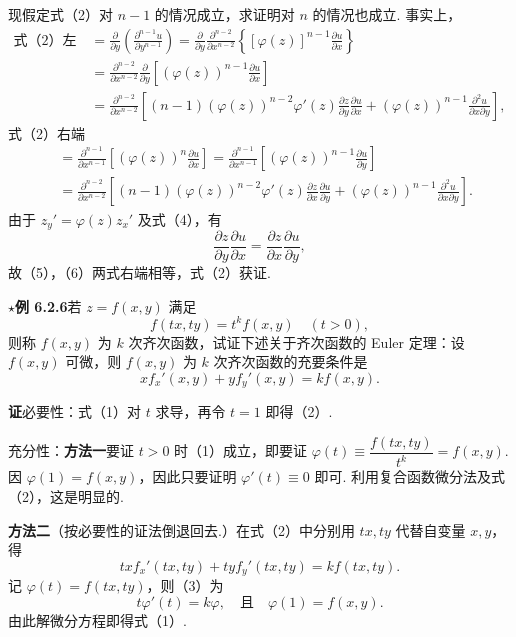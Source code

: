 \documentclass[UTF8,12pt,a4paper,fontset=fandol]{ctexart}
\begin{document}
现假定式（2）对 $n-1$ 的情况成立，求证明对 $n$ 的情况也成立. 事实上，
\[
\begin{aligned}
  \text{式（2）左端}
  &=\frac{\partial}{\partial y}\left(\frac{\partial^{n-1}u}{\partial y^{n-1}}\right)
  =\frac{\partial}{\partial y}\frac{\partial^{n-2}}{\partial x^{n-2}}
  \left\{[\varphi(z)]^{n-1}\frac{\partial u}{\partial x}\right\}\\
  &=\frac{\partial^{n-2}}{\partial x^{n-2}}\frac{\partial}{\partial y}
  \left[(\varphi(z))^{n-1}\frac{\partial u}{\partial x}\right]\\
  &=\frac{\partial^{n-2}}{\partial x^{n-2}}\left[
  (n-1)(\varphi(z))^{n-2}\varphi'(z)\frac{\partial z}{\partial y}\frac{\partial u}{\partial x}
  +(\varphi(z))^{n-1}\frac{\partial^2u}{\partial x\partial y}\right],
\end{aligned} \tag{5}
\]
式（2）右端
\[
\begin{aligned}
  &=\frac{\partial^{n-1}}{\partial x^{n-1}}\left[(\varphi(z))^n\frac{\partial u}{\partial x}\right]
  =\frac{\partial^{n-1}}{\partial x^{n-1}}\left[(\varphi(z))^{n-1}\frac{\partial u}{\partial y}\right]\\
  &=\frac{\partial^{n-2}}{\partial x^{n-2}}\left[
  (n-1)(\varphi(z))^{n-2}\varphi'(z)\frac{\partial z}{\partial x}\frac{\partial u}{\partial y}
  +(\varphi(z))^{n-1}\frac{\partial^2u}{\partial x\partial y}\right].
\end{aligned} \tag{6}
\]
由于 $z_y'=\varphi(z)z_x'$ 及式（4），有
\[
  \frac{\partial z}{\partial y}\frac{\partial u}{\partial x}
  =\frac{\partial z}{\partial x}\frac{\partial u}{\partial y},
\]
故（5），（6）两式右端相等，式（2）获证.

\noindent\textbf{\ensuremath{\star}例 6.2.6}\quad 若 $z=f(x,y)$ 满足
\[
  f(tx,ty)=t^kf(x,y)\quad(t>0), \tag{1}
\]
则称 $f(x,y)$ 为 $k$ 次齐次函数，试证下述关于齐次函数的 Euler 定理：设 $f(x,y)$ 可微，则 $f(x,y)$ 为 $k$ 次齐次函数的充要条件是
\[
  xf_x'(x,y)+yf_y'(x,y)=kf(x,y). \tag{2}
\]

\noindent\textbf{证}\quad 必要性：式（1）对 $t$ 求导，再令 $t=1$ 即得（2）.

充分性：\textbf{方法一}\quad 要证 $t>0$ 时（1）成立，即要证 $\varphi(t)\equiv\dfrac{f(tx,ty)}{t^k}=f(x,y)$. 因 $\varphi(1)=f(x,y)$，因此只要证明 $\varphi'(t)\equiv0$ 即可. 利用复合函数微分法及式（2），这是明显的.

\textbf{方法二}\quad （按必要性的证法倒退回去.）在式（2）中分别用 $tx,ty$ 代替自变量 $x,y$，得
\[
  txf_x'(tx,ty)+tyf_y'(tx,ty)=kf(tx,ty). \tag{3}
\]
记 $\varphi(t)=f(tx,ty)$，则（3）为
\[
  t\varphi'(t)=k\varphi,\quad \text{且}\quad \varphi(1)=f(x,y).
\]
由此解微分方程即得式（1）.
\end{document}
